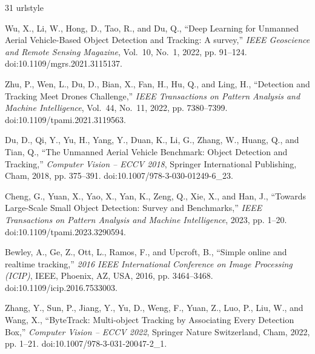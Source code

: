 \documentclass[journal]{new-aiaa}
\begin{document}
\begin{thebibliography}{31}
\newcommand{\enquote}[1]{``#1''}
\providecommand{\natexlab}[1]{#1}
\providecommand{\url}[1]{\texttt{#1}}
\providecommand{\urlprefix}{URL }
\expandafter\ifx\csname urlstyle\endcsname\relax
  \providecommand{\doi}[1]{doi:\discretionary{}{}{}#1}\else
  \providecommand{\doi}{doi:\discretionary{}{}{}\begingroup
  \urlstyle{rm}\Url}\fi

Wu, X., Li, W., Hong, D., Tao, R., and Du, Q., \enquote{{Deep Learning for
  Unmanned Aerial Vehicle-Based Object Detection and Tracking: A survey},}
  \emph{IEEE Geoscience and Remote Sensing Magazine}, Vol.~10, No.~1, 2022, pp.
  91--124.
\newblock \doi{10.1109/mgrs.2021.3115137}.

Zhu, P., Wen, L., Du, D., Bian, X., Fan, H., Hu, Q., and Ling, H.,
  \enquote{{Detection and Tracking Meet Drones Challenge},} \emph{IEEE
  Transactions on Pattern Analysis and Machine Intelligence}, Vol.~44, No.~11,
  2022, pp. 7380--7399.
\newblock \doi{10.1109/tpami.2021.3119563}.

Du, D., Qi, Y., Yu, H., Yang, Y., Duan, K., Li, G., Zhang, W., Huang, Q., and
  Tian, Q., \enquote{{The Unmanned Aerial Vehicle Benchmark: Object Detection
  and Tracking},} \emph{Computer Vision -- ECCV 2018}, Springer International
  Publishing, Cham, 2018, pp. 375--391.
\newblock \doi{10.1007/978-3-030-01249-6_23}.

Cheng, G., Yuan, X., Yao, X., Yan, K., Zeng, Q., Xie, X., and Han, J.,
  \enquote{{Towards Large-Scale Small Object Detection: Survey and
  Benchmarks},} \emph{IEEE Transactions on Pattern Analysis and Machine
  Intelligence}, 2023, pp. 1--20.
\newblock \doi{10.1109/tpami.2023.3290594}.

Bewley, A., Ge, Z., Ott, L., Ramos, F., and Upcroft, B., \enquote{{Simple
  online and realtime tracking},} \emph{2016 IEEE International Conference on
  Image Processing (ICIP)}, IEEE, Phoenix, AZ, USA, 2016, pp. 3464--3468.
\newblock \doi{10.1109/icip.2016.7533003}.

Zhang, Y., Sun, P., Jiang, Y., Yu, D., Weng, F., Yuan, Z., Luo, P., Liu, W.,
  and Wang, X., \enquote{{ByteTrack: Multi-object Tracking by Associating Every
  Detection Box},} \emph{Computer Vision -- ECCV 2022}, Springer Nature
  Switzerland, Cham, 2022, pp. 1--21.
\newblock \doi{10.1007/978-3-031-20047-2_1}.


\end{thebibliography}
\end{document}
